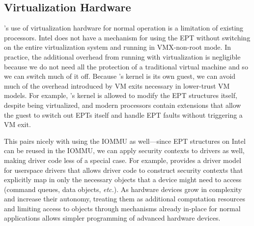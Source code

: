 \subsection{Virtualization Hardware}
\Twizzler's use of virtualization hardware for normal operation is a limitation of existing
processors. Intel does not have a mechanism for using the EPT without switching on the entire
virtualization system and running in VMX-non-root mode. In practice, the additional
overhead from running with virtualization is negligible because we do not need all the protection of
a traditional virtual machine and so we can switch much of it off. Because \Twizzler's kernel is its own
guest, we can avoid much of the overhead introduced by VM exits necessary in lower-trust VM models.
For example, \Twizzler's kernel is allowed to modify the EPT structures itself, despite being
virtualized, and modern processors contain extensions that allow the guest to switch out EPTs itself
and handle EPT faults without triggering a VM exit.

This pairs nicely with using the IOMMU as well---since EPT structures on Intel can be reused in the
IOMMU, we can apply security contexts to drivers as well, making driver code less of a special case.
For example, \Twizzler provides a driver model for userspace drivers that allows driver code to
construct security contexts that explicitly map in only the necessary objects that a device might
need to access (\eg command queues, data objects, \emph{etc.}). As hardware devices grow in complexity and
increase their autonomy, treating them as additional computation resources and limiting access to
objects through mechanisms already in-place for normal applications allows simpler programming of
advanced hardware devices.





